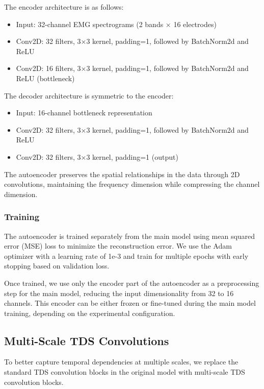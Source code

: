 The encoder architecture is as follows:
\begin{itemize}
    \item Input: 32-channel EMG spectrograms (2 bands × 16 electrodes)
    \item Conv2D: 32 filters, 3×3 kernel, padding=1, followed by BatchNorm2d and ReLU
    \item Conv2D: 16 filters, 3×3 kernel, padding=1, followed by BatchNorm2d and ReLU (bottleneck)
\end{itemize}

The decoder architecture is symmetric to the encoder:
\begin{itemize}
    \item Input: 16-channel bottleneck representation
    \item Conv2D: 32 filters, 3×3 kernel, padding=1, followed by BatchNorm2d and ReLU
    \item Conv2D: 32 filters, 3×3 kernel, padding=1 (output)
\end{itemize}

The autoencoder preserves the spatial relationships in the data through 2D convolutions, maintaining the frequency dimension while compressing the channel dimension.

\subsubsection{Training}

The autoencoder is trained separately from the main model using mean squared error (MSE) loss to minimize the reconstruction error. We use the Adam optimizer with a learning rate of 1e-3 and train for multiple epochs with early stopping based on validation loss.

Once trained, we use only the encoder part of the autoencoder as a preprocessing step for the main model, reducing the input dimensionality from 32 to 16 channels. This encoder can be either frozen or fine-tuned during the main model training, depending on the experimental configuration.

\subsection{Multi-Scale TDS Convolutions}

To better capture temporal dependencies at multiple scales, we replace the standard TDS convolution blocks in the original model with multi-scale TDS convolution blocks.

